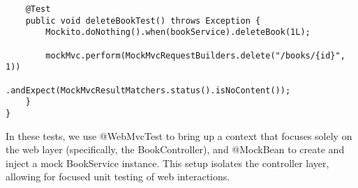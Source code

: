 \begin{lstlisting}
    @Test
    public void deleteBookTest() throws Exception {
        Mockito.doNothing().when(bookService).deleteBook(1L);

        mockMvc.perform(MockMvcRequestBuilders.delete("/books/{id}", 1))
                .andExpect(MockMvcResultMatchers.status().isNoContent());
    }
}

\end{lstlisting}

In these tests, we use @WebMvcTest to bring up a context that focuses solely on the web layer (specifically, the BookController), and @MockBean to create and inject a mock BookService instance. This setup isolates the controller layer, allowing for focused unit testing of web interactions.


